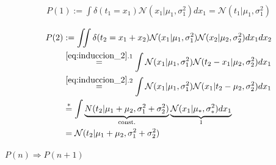\documentclass[article]{jss}
\newif\ifen
\newif\ifes
\newcommand{\en}[1]{\ifen#1\fi}
\newcommand{\es}[1]{\ifes#1\fi}
\newcommand{\N}{\mathcal{N}}
\begin{document}
\paragraph{\en{Base case}}

\begin{equation}
\begin{split}
 P(1) := \int \delta(t_1 = x_1) \N(x_1|\mu_1,\sigma_1^2) dx_1 = \N(t_1|\mu_1,\sigma_1^2)
\end{split}
\end{equation}
%
\en{The proporisition $P(1)$ is true given the properties of the delta Dirac function.}
\es{La proposición $P(1)$ es verdadera dada las propiedades de la función delta de dirac.}
\begin{equation}\label{eq:induccion_2}
 \begin{split}
P(2) & := \iint \delta(t_2 = x_1 + x_2) \N(x_1|\mu_1, \sigma_1^2)\N(x_2|\mu_2, \sigma_2^2) dx_1dx_2 \\
 & \overset{\ref{eq:induccion_2}.1}{=} \int \N(x_1|\mu_1, \sigma_1^2) \N(t_2 - x_1|\mu_2, \sigma_2^2) dx_1   \\
 & \overset{\ref{eq:induccion_2}.2}{=} \int \N(x_1|\mu_1, \sigma_1^2) \N(x_1|t_2 - \mu_2, \sigma_2^2) dx_1 \\
 & \overset{*}{=} \int \underbrace{N(t_2|\mu_1+\mu_2,\sigma_1^2 + \sigma_2^2)}_{\text{const.}} \underbrace{\N(x_1|\mu_{*},\sigma_{*}^2) dx_1}_{1} \\
 & = \N(t_2|\mu_1+\mu_2,\sigma_1^2 + \sigma_2^2)
 \end{split}
 \end{equation}
%
 \en{Where $\overset{\ref{eq:induccion_2}.1}{=}$ is valid for the properties of the dirac delta function, $\overset{\ref{eq:induccion_2}.2}{=}$ is valid for the symmetry of the Gaussians, and $\overset{*}{=}$ is valid by de proof at section~\ref{multiplicacion_normales}.}
 \es{Donde $\overset{\ref{eq:induccion_2}.1}{=}$ vale por las propiedades de la función delta de dirac, $\overset{\ref{eq:induccion_2}.2}{=}$ vale por la simetría de las gaussianas, y $\overset{*}{=}$ vale por la demostraci\'on de miltiplicaci\'on de normales en la secci\'on~\ref{multiplicacion_normales}.}
 \en{Therefore, $P(2)$ is valid.}
 \es{Luego, vale $P(2)$.}


\paragraph{\en{Inductive step}} $P(n) \Rightarrow P(n+1)$
\end{document}
